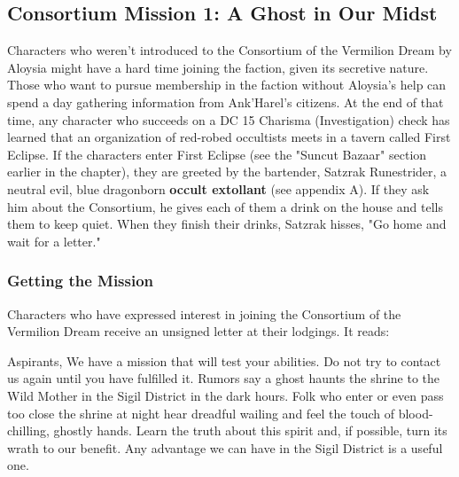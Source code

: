 \documentclass[10pt,a4,twoside,twocolumn,openany,nodeprecatedcode]{dndbook}
\begin{document}
\subsection{Consortium Mission 1: A Ghost in Our Midst}
Characters who weren't introduced to the Consortium of the Vermilion Dream by Aloysia might have a hard time joining the faction, given its secretive nature. Those who want to pursue membership in the faction without Aloysia's help can spend a day gathering information from Ank'Harel's citizens. At the end of that time, any character who succeeds on a DC 15 Charisma (Investigation) check has learned that an organization of red-robed occultists meets in a tavern called First Eclipse.
If the characters enter First Eclipse (see the "Suncut Bazaar" section earlier in the chapter), they are greeted by the bartender, Satzrak Runestrider, a neutral evil, blue dragonborn \textbf{occult extollant} (see appendix A). If they ask him about the Consortium, he gives each of them a drink on the house and tells them to keep quiet. When they finish their drinks, Satzrak hisses, "Go home and wait for a letter."
\subsubsection{Getting the Mission}
Characters who have expressed interest in joining the Consortium of the Vermilion Dream receive an unsigned letter at their lodgings. It reads:
\begin{DndReadAloud}{}
Aspirants,
We have a mission that will test your abilities. Do not try to contact us again until you have fulfilled it.
Rumors say a ghost haunts the shrine to the Wild Mother in the Sigil District in the dark hours. Folk who enter or even pass too close the shrine at night hear dreadful wailing and feel the touch of blood-chilling, ghostly hands.
Learn the truth about this spirit and, if possible, turn its wrath to our benefit. Any advantage we can have in the Sigil District is a useful one.
\end{DndReadAloud}
\end{document}

